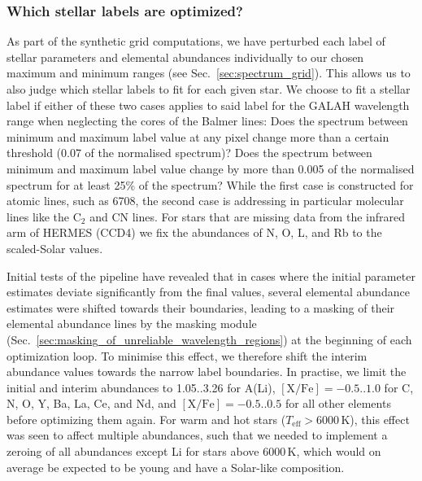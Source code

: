 \documentclass[
  journal=pasa,
  manuscript=research-paper, %
  year=2024,
  volume=37
]{cup-journal}
\newcommand\ion[2]{\text{#1\,\textsc{\lowercase{#2}}}}	%
\newcommand{\K}{\,\mathrm{K}}	%
\begin{document}
\subsubsection{Which stellar labels are optimized?} \label{sec:which_labels_are_optimized}


As part of the synthetic grid computations, we have perturbed each label of stellar parameters and elemental abundances individually to our chosen maximum and minimum ranges (see Sec.~\ref{sec:spectrum_grid}). This allows us to also judge which stellar labels to fit for each given star. We choose to fit a stellar label if either of these two cases applies to said label for the GALAH wavelength range when neglecting the cores of the Balmer lines: Does the spectrum between minimum and maximum label value at any pixel change more than a certain threshold (0.07 of the normalised spectrum)? Does the spectrum between minimum and maximum label value change by more than 0.005 of the normalised spectrum for at least 25\% of the spectrum? While the first case is constructed for atomic lines, such as \ion{Li}{i} 6708, the second case is addressing in particular molecular lines like the $\mathrm{C_2}$ and $\mathrm{CN}$ lines. For stars that are missing data from the infrared arm of HERMES (CCD4) we fix the abundances of N, O, L, and Rb to the scaled-Solar values.

Initial tests of the pipeline have revealed that in cases where the initial parameter estimates deviate significantly from the final values, several elemental abundance estimates were shifted towards their boundaries, leading to a masking of their elemental abundance lines by the masking module (Sec.~\ref{sec:masking_of_unreliable_wavelength_regions}) at the beginning of each optimization loop. To minimise this effect, we therefore shift the interim abundance values towards the narrow label boundaries. In practise, we limit the initial and interim abundances to 1.05..3.26 for A(Li), $\mathrm{[X/Fe]} = -0.5..1.0$ for C, N, O, Y, Ba, La, Ce, and Nd, and $\mathrm{[X/Fe]} = -0.5..0.5$ for all other elements before optimizing them again. For warm and hot stars ($T_\text{eff} > 6000\K$), this effect was seen to affect multiple abundances, such that we needed to implement a zeroing of all abundances except Li for stars above $6000\K$, which would on average be expected to be young and have a Solar-like composition.
\end{document}
